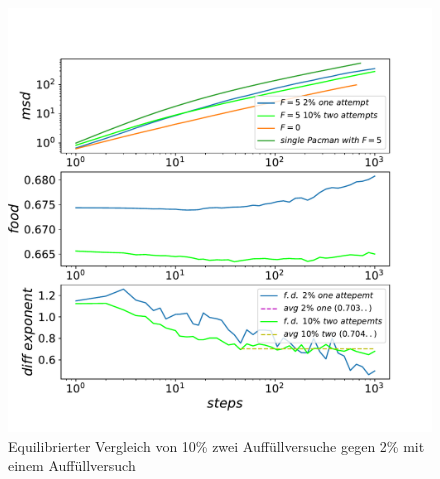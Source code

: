 \documentclass[a4paper, 12pt]{report}
\begin{document}
\begin{figure}[H]
	\centering
	\includegraphics[scale=0.75]{10_2_vs_2_1.pdf}
	\caption{Equilibrierter Vergleich von 10\% zwei Auffüllversuche gegen 2\% mit einem Auffüllversuch}
\end{figure}

\clearpage
\end{document}
